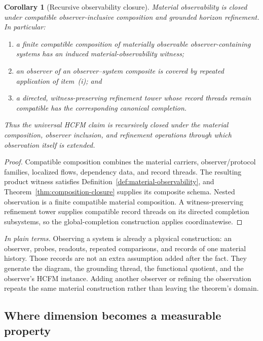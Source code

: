 \documentclass[11pt]{article}
\newtheorem{corollary}{Corollary}
\theoremstyle{definition}
\newcommand{\plainterms}{\emph{In plain terms.}}
\begin{document}
\begin{corollary}[Recursive observability closure] \label{cor:recursive-observability-closure} Material observability is closed under compatible observer-inclusive composition and grounded horizon refinement. In particular: \begin{enumerate}[label=(\roman*)] \item a finite compatible composition of materially observable observer-containing systems has an induced material-observability witness; \item an observer of an observer--system composite is covered by repeated application of item~(i); and \item a directed, witness-preserving refinement tower whose record threads remain compatible has the corresponding canonical completion. \end{enumerate} Thus the universal HCFM claim is recursively closed under the material composition, observer inclusion, and refinement operations through which observation itself is extended. \end{corollary} \begin{proof} Compatible composition combines the material carriers, observer/protocol families, localized flows, dependency data, and record threads. The resulting product witness satisfies Definition~\ref{def:material-observability}, and Theorem~\ref{thm:composition-closure} supplies its composite schema. Nested observation is a finite compatible material composition. A witness-preserving refinement tower supplies compatible record threads on its directed completion subsystems, so the global-completion construction applies coordinatewise. \end{proof} \noindent\plainterms{} Observing a system is already a physical construction: an observer, probes, readouts, repeated comparisons, and records of one material history. Those records are not an extra assumption added after the fact. They generate the diagram, the grounding thread, the functional quotient, and the observer's HCFM instance. Adding another observer or refining the observation repeats the same material construction rather than leaving the theorem's domain.

\subsection{Where dimension becomes a measurable property}
\end{document}
